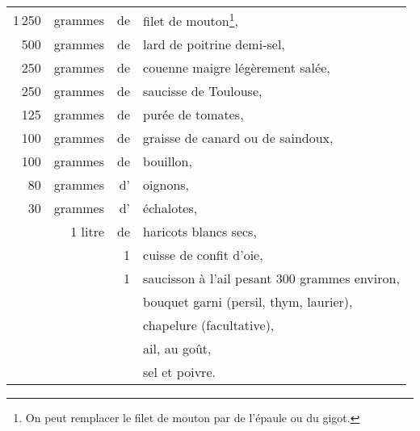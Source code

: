 \footnotesize
\begin{longtable}{rrrp{18em}}
  1 250 & grammes & de & filet de mouton\footnote{On peut remplacer le filet
                                         de mouton par de l'épaule ou du gigot.},                         \\

    500 & grammes & de & lard de poitrine demi-sel,                                                       \\
    250 & grammes & de & couenne maigre légèrement salée,                                                 \\
    250 & grammes & de & saucisse de Toulouse,                                                            \\
    125 & grammes & de & purée de tomates,                                                                \\
    100 & grammes & de & graisse de canard ou de saindoux,                                                \\
    100 & grammes & de & bouillon,                                                                        \\
     80 & grammes & d' & oignons,                                                                         \\
     30 & grammes & d' & échalotes,                                                                       \\
        & 1 litre & de & haricots blancs secs,                                                            \\
        &         &  1 & cuisse de confit d'oie,                                                          \\
        &         &  1 & saucisson à l'ail pesant 300 grammes environ,                                    \\
        &         &    & bouquet garni (persil, thym, laurier),                                           \\
        &         &    & chapelure (facultative),                                                         \\
        &         &    & ail, au goût,                                                                    \\
        &         &    & sel et poivre.                                                                   \\
\end{longtable}
\normalsize

